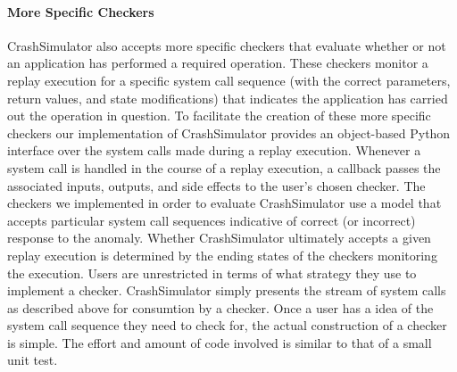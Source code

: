 \paragraph{More Specific Checkers}

CrashSimulator also accepts more specific checkers that evaluate whether or
not an application has performed a required operation.  These checkers
monitor a replay execution for a specific system call sequence (with the
correct parameters, return values, and state modifications) that indicates
the application has carried out the operation in question.  To
facilitate the creation of these more specific checkers our
implementation of CrashSimulator provides an object-based Python interface
over the system calls made during a replay execution.
Whenever a system call is handled in the course of a replay
execution, a callback passes the associated inputs, outputs, and side effects to the user's
chosen checker.  The checkers we implemented in order to evaluate
CrashSimulator
use a model that accepts particular system
call sequences indicative of correct (or incorrect) response
to the anomaly.  Whether CrashSimulator
ultimately accepts a given replay execution is determined by the ending
states of the checkers monitoring the execution.
Users are unrestricted in terms of what strategy they use to implement a
checker.  CrashSimulator simply presents the stream of system calls as described
above for consumtion by a checker.  Once a user has a idea of the system call
sequence they need to check for, the actual construction of a checker is
simple.  The effort and amount of code involved is similar to that of a small
unit test.
%        
%
